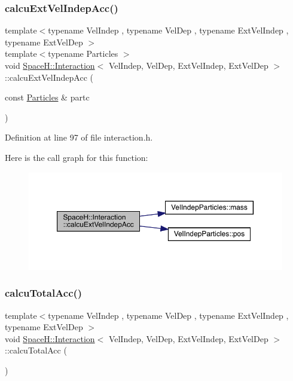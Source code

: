 \subsubsection{\texorpdfstring{calcu\+Ext\+Vel\+Indep\+Acc()}{calcuExtVelIndepAcc()}}
{\footnotesize\ttfamily template$<$typename Vel\+Indep , typename Vel\+Dep , typename Ext\+Vel\+Indep , typename Ext\+Vel\+Dep $>$ \\
template$<$typename Particles $>$ \\
void \mbox{\hyperlink{class_space_h_1_1_interaction}{Space\+H\+::\+Interaction}}$<$ Vel\+Indep, Vel\+Dep, Ext\+Vel\+Indep, Ext\+Vel\+Dep $>$\+::calcu\+Ext\+Vel\+Indep\+Acc (\begin{DoxyParamCaption}\item[{const \mbox{\hyperlink{struct_particles}{Particles}} \&}]{partc }\end{DoxyParamCaption})\hspace{0.3cm}{\ttfamily [inline]}}



Definition at line 97 of file interaction.\+h.

Here is the call graph for this function\+:\nopagebreak
\begin{figure}[H]
\begin{center}
\leavevmode
\includegraphics[width=350pt]{class_space_h_1_1_interaction_a1121ca910c3c919b9239ed57ecb79440_cgraph}
\end{center}
\end{figure}
\mbox{\label{class_space_h_1_1_interaction_a28a437fd17fe9b6190ca5aa321264c13}} 
\subsubsection{\texorpdfstring{calcu\+Total\+Acc()}{calcuTotalAcc()}}
{\footnotesize\ttfamily template$<$typename Vel\+Indep , typename Vel\+Dep , typename Ext\+Vel\+Indep , typename Ext\+Vel\+Dep $>$ \\
void \mbox{\hyperlink{class_space_h_1_1_interaction}{Space\+H\+::\+Interaction}}$<$ Vel\+Indep, Vel\+Dep, Ext\+Vel\+Indep, Ext\+Vel\+Dep $>$\+::calcu\+Total\+Acc (\begin{DoxyParamCaption}{ }\end{DoxyParamCaption})\hspace{0.3cm}{\ttfamily [inline]}}



